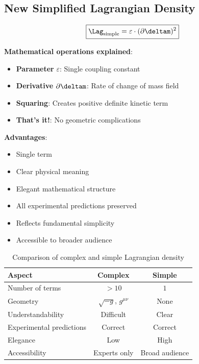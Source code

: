 	\subsection{New Simplified Lagrangian Density}
	
	\begin{equation}
		\boxed{\Lag_{\text{simple}} = \varepsilon \cdot (\partial \deltam)^2}
	\end{equation}
	
	\textbf{Mathematical operations explained}:
	\begin{itemize}
		\item \textbf{Parameter} $\varepsilon$: Single coupling constant
		\item \textbf{Derivative} $\partial \deltam$: Rate of change of mass field
		\item \textbf{Squaring}: Creates positive definite kinetic term
		\item \textbf{That's it!}: No geometric complications
	\end{itemize}
	
	\textbf{Advantages}:
	\begin{itemize}
		\item Single term
		\item Clear physical meaning
		\item Elegant mathematical structure
		\item All experimental predictions preserved
		\item Reflects fundamental simplicity
		\item Accessible to broader audience
	\end{itemize}
	
	\begin{table}[htbp]
		\centering
		\begin{tabular}{lcc}
			\toprule
			\textbf{Aspect} & \textbf{Complex} & \textbf{Simple} \\
			\midrule
			Number of terms & $>10$ & $1$ \\
			Geometry & $\sqrt{-g}$, $g^{\mu\nu}$ & None \\
			Understandability & Difficult & Clear \\
			Experimental predictions & Correct & Correct \\
			Elegance & Low & High \\
			Accessibility & Experts only & Broad audience \\
			\bottomrule
		\end{tabular}
		\caption{Comparison of complex and simple Lagrangian density}
		\label{tab:complexity_comparison}
	\end{table}
	
